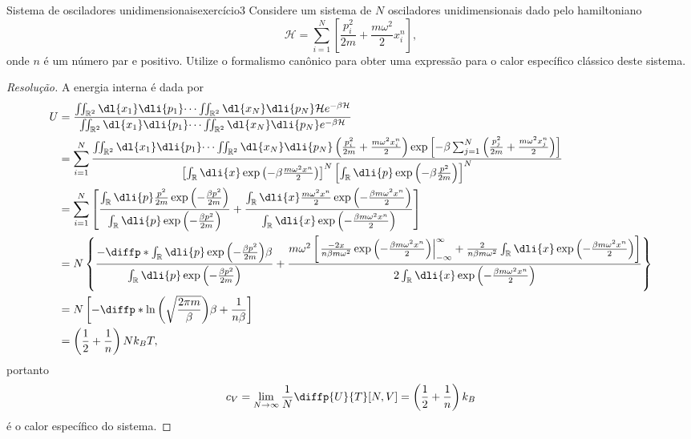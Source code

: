 \begin{exercício}{Sistema de osciladores unidimensionais}{exercício3}
    Considere um sistema de \(N\) osciladores unidimensionais dado pelo hamiltoniano
    \begin{equation*}
        \mathcal{H} = \sum_{i = 1}^N\left[\frac{p_i^2}{2m} + \frac{m\omega^2}{2}x_i^n\right],
    \end{equation*}
    onde \(n\) é um número par e positivo. Utilize o formalismo canônico para obter uma expressão para o calor específico clássico deste sistema.
\end{exercício}
\begin{proof}[Resolução]
    A energia interna é dada por
    \begin{align*}
        U &= \frac{\iint_{\mathbb{R}^2} \dl{x_1}\dli{p_1}\dots \iint_{\mathbb{R}^2} \dl{x_N}\dli{p_N} \mathcal{H}e^{-\beta \mathcal{H}}}{\iint_{\mathbb{R}^2} \dl{x_1}\dli{p_1}\dots \iint_{\mathbb{R}^2}\dl{x_N}\dli{p_N}e^{-\beta \mathcal{H}}}\\
          &= \sum_{i=1}^N\frac{\iint_{\mathbb{R}^2} \dl{x_1}\dli{p_1}\dots \iint_{\mathbb{R}^2} \dl{x_N}\dli{p_N} \left(\frac{p_i^2}{2m} + \frac{m\omega^2 x_i^n}{2}\right)\exp\left[-\beta \sum_{j=1}^N \left(\frac{p_j^2}{2m} + \frac{m\omega^2 x_j^n}{2}\right)\right]}{\left[\int_{\mathbb{R}} \dli{x} \exp\left(-\beta\frac{m\omega^2 x^n}{2}\right)\right]^N\left[\int_{\mathbb{R}}\dli{p}\exp\left(-\beta \frac{p^2}{2m}\right)\right]^N}\\
          &= \sum_{i=1}^N \left[\frac{\int_{\mathbb{R}} \dli{p} \frac{p^2}{2m}\exp\left(-\frac{\beta p^2}{2m}\right)}{\int_{\mathbb{R}}\dli{p}\exp\left(-\frac{\beta p^2}{2m}\right)}+\frac{\int_{\mathbb{R}}\dli{x} \frac{m\omega^2 x^n}{2}\exp\left(-\frac{\beta m\omega^2x^n}{2}\right)}{\int_{\mathbb{R}} \dli{x} \exp\left(-\frac{\beta m\omega^2 x^n}{2}\right)}\right]\\
          &= N\left\{\frac{-\diffp*{\int_{\mathbb{R}}\dli{p}\exp\left(-\frac{\beta p^2}{2m}\right)}{\beta}}{\int_{\mathbb{R}}\dli{p}\exp\left(-\frac{\beta p^2}{2m}\right)} + \frac{m\omega^2 \left[\left.\frac{-2x}{n \beta m \omega^2}\exp\left(-\frac{\beta m\omega^2 x^n}{2}\right)\right\vert_{-\infty}^\infty + \frac{2}{n \beta m \omega^2}\int_{\mathbb{R}}\dli{x}\exp\left(-\frac{\beta m\omega^2 x^n}{2}\right)\right]}{2\int_{\mathbb{R}}\dli{x} \exp\left(-\frac{\beta m \omega^2 x^n}{2}\right)}\right\}\\
          &= N\left[- \diffp*{\ln\left(\sqrt{\frac{2\pi m}{\beta}}\right)}{\beta} + \frac{1}{n \beta}\right]\\
          &= \left(\frac{1}{2} + \frac{1}{n}\right)Nk_B T,
    \end{align*}
    portanto
    \begin{equation*}
        c_V = \lim_{N\to \infty} \frac{1}{N} \diffp{U}{T}[N, V] = \left(\frac12 + \frac1n\right)k_B
    \end{equation*}
    é o calor específico do sistema.
\end{proof}
